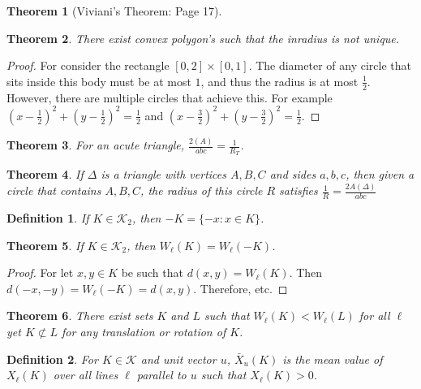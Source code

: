 \documentclass[12pt,oneside]{book}
\theoremstyle{mystyle}
\newtheorem{theorem}{Theorem}[section]
\newtheorem{definition}{Definition}[section]
\begin{document}
\begin{theorem}[Viviani's Theorem: Page 17]
\end{theorem}

\begin{theorem}
There exist convex polygon's such that the inradius is not unique.
\end{theorem}
\begin{proof}
For consider the rectangle $[0,2]\times [0,1]$. The diameter of any circle that sits inside this body must be at most $1$, and thus the radius is at most $\frac{1}{2}$. However, there are multiple circles that achieve this. For example $(x-\frac{1}{2})^2+(y-\frac{1}{2})^2=\frac{1}{2}$ and $(x-\frac{3}{2})^2+(y-\frac{3}{2})^2=\frac{1}{2}$.
\end{proof}

\begin{theorem}
For an acute triangle, $\frac{2(A)}{abc} = \frac{1}{R_T}$.
\end{theorem}

\begin{theorem}
If $\Delta$ is a triangle with vertices $A,B,C$ and sides $a,b,c$, then given a circle that contains $A,B,C$, the radius of this circle $R$ satisfies $\frac{1}{R} =\frac{2A(\Delta)}{abc}$
\end{theorem}

\begin{definition}
If $K\in \mathscr{K}_2$, then $-K = \{-x:x\in K\}$.
\end{definition}

\begin{theorem}
If $K\in \mathscr{K}_2$, then $W_{\ell}(K) = W_{\ell}(-K)$.
\end{theorem}
\begin{proof}
For let $x,y\in K$ be such that $d(x,y) = W_{\ell}(K)$. Then $d(-x,-y) = W_{\ell}(-K) = d(x,y)$. Therefore, etc.
\end{proof}

\begin{theorem}
There exist sets $K$ and $L$ such that $W_{\ell}(K)<W_{\ell}(L)$ for all $\ell$ yet $K\not\subset L$ for any translation or rotation of $K$.
\end{theorem}

\begin{definition}
For $K\in \mathscr{K}$ and unit vector $u$, $\bar{X}_{u}(K)$ is the mean value of $X_{\ell}(K)$ over all lines $\ell$ parallel to $u$ such that $X_{\ell}(K)>0$.
\end{definition}
\end{document}
